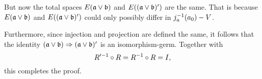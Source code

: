 \begin{myproof}
\begin{sectionize}
        But now the total spaces $E(\ba \vee \bb)$ and $E((\ba \vee \bb)')$ are the same.
        That is because $E(\ba \vee \bb)$ and $E((\ba \vee \bb)')$
        could only possibly differ in $j_a^{-1}(a_0) - V$.
        
        Furthermore, since injection and projection are defined the same,
        it follows that the identity $\germ{(\ba \vee \bb)}{(\ba \vee \bb)'}$
        is an isomorphism-germ.
        Together with
        \[ R'^{-1} \circ R = R^{-1} \circ R = I, \]
        this completes the proof.
    \end{sectionize}
\end{myproof}